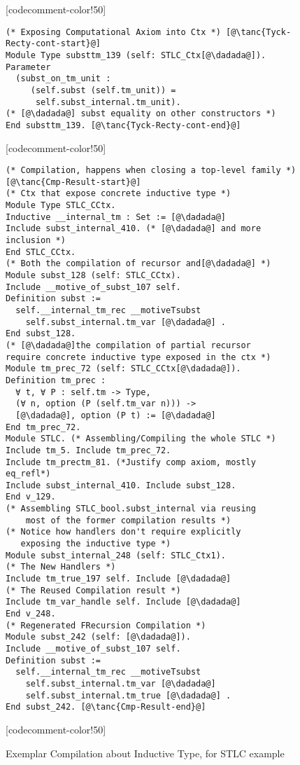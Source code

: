 \begin{figure}
\begin{minipage}{\textwidth}
\begin{multicols}{2}
[codecomment-color!50]

\columnbreak



\begin{lstlisting}
(* Exposing Computational Axiom into Ctx *) [@\tanc{Tyck-Recty-cont-start}@]
Module Type substtm_139 (self: STLC_Ctx[@\dadada@]).
Parameter
  (subst_on_tm_unit :
	 (self.subst (self.tm_unit)) = 
      self.subst_internal.tm_unit).
(* [@\dadada@] subst equality on other constructors *)
End substtm_139. [@\tanc{Tyck-Recty-cont-end}@]
\end{lstlisting}



[codecomment-color!50]



\begin{lstlisting}
(* Compilation, happens when closing a top-level family *) [@\tanc{Cmp-Result-start}@]
(* Ctx that expose concrete inductive type *)
Module Type STLC_CCtx.
Inductive __internal_tm : Set := [@\dadada@] 
Include subst_internal_410. (* [@\dadada@] and more inclusion *)
End STLC_CCtx.
(* Both the compilation of recursor and[@\dadada@] *)
Module subst_128 (self: STLC_CCtx).
Include __motive_of_subst_107 self.
Definition subst :=
  self.__internal_tm_rec __motiveTsubst
	self.subst_internal.tm_var [@\dadada@] .
End subst_128.
(* [@\dadada@]the compilation of partial recursor 
require concrete inductive type exposed in the ctx *)
Module tm_prec_72 (self: STLC_CCtx[@\dadada@]).
Definition tm_prec :
  ∀ t, ∀ P : self.tm -> Type,
  (∀ n, option (P (self.tm_var n))) ->
  [@\dadada@], option (P t) := [@\dadada@]
End tm_prec_72. 
Module STLC. (* Assembling/Compiling the whole STLC *)
Include tm_5. Include tm_prec_72. 
Include tm_prectm_81. (*Justify comp axiom, mostly eq_refl*)
Include subst_internal_410. Include subst_128.
End v_129.
(* Assembling STLC_bool.subst_internal via reusing 
    most of the former compilation results *)
(* Notice how handlers don't require explicitly
   exposing the inductive type *)
Module subst_internal_248 (self: STLC_Ctx1).
(* The New Handlers *)
Include tm_true_197 self. Include [@\dadada@]
(* The Reused Compilation result *)
Include tm_var_handle self. Include [@\dadada@]
End v_248. 
(* Regenerated FRecursion Compilation *)
Module subst_242 (self: [@\dadada@]).
Include __motive_of_subst_107 self.
Definition subst :=
  self.__internal_tm_rec __motiveTsubst
	self.subst_internal.tm_var [@\dadada@]
    self.subst_internal.tm_true [@\dadada@] .
End subst_242. [@\tanc{Cmp-Result-end}@]
\end{lstlisting}



[codecomment-color!50]

\end{multicols}
\end{minipage}

\caption{Exemplar Compilation about Inductive Type, for STLC example}\label{fig:plugin-example2}
\end{figure}